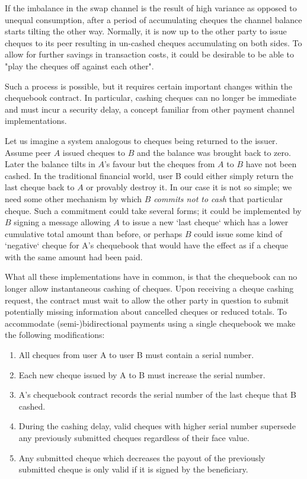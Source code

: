 If the imbalance in the swap channel is the result of high variance as opposed to unequal consumption, after a period of accumulating cheques the channel balance starts tilting the other way. Normally, it is now up to the other party to issue cheques to its peer resulting in un-cashed cheques accumulating on both sides.
To allow for further savings in transaction costs, it could be desirable to be able to "play the cheques off against each other".

Such a process is possible, but it requires certain important changes within the chequebook contract. In particular, cashing cheques can no longer be immediate and must incur a security delay, a concept familiar from other payment channel implementations. 

Let us imagine a system analogous to cheques being returned to the issuer. Assume peer $A$ issued cheques to $B$ and the balance was brought back to zero. Later the balance tilts in $A$'s favour but the cheques from $A$ to $B$ have not been cashed. In the traditional financial world, user B could either simply return the last cheque back to $A$ or provably destroy it. In our case it is not so simple; we need some other mechanism by which $B$ \emph{commits not to cash} that particular cheque. Such a commitment could take several forms; it could be implemented by $B$ signing a message allowing $A$ to issue a new `last cheque` which has a lower cumulative total amount than before, or perhaps $B$ could issue some kind of `negative` cheque for A's chequebook that would have the effect as if a cheque with the same amount had been paid. 

What all these implementations have in common, is that the chequebook can no longer allow instantaneous cashing of cheques. Upon receiving a cheque cashing request, the contract must wait to allow the other party in question to submit potentially missing information about cancelled cheques or reduced totals. To accommodate (semi-)bidirectional payments using a single chequebook we make the following modifications:

\begin{enumerate}
    \item All cheques from user A to user B must contain a serial number.
    \item Each new cheque issued by A to B must increase the serial number.
    \item A's chequebook contract records the serial number of the last cheque that B cashed.
    \item During the cashing delay, valid cheques with higher serial number supersede any previously submitted cheques regardless of their face value.
    \item Any submitted cheque which decreases the payout of the previously submitted cheque is only valid if it is signed by the beneficiary.
\end{enumerate}


